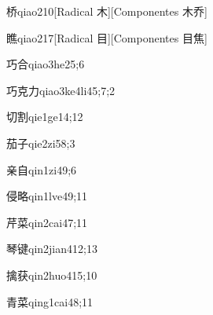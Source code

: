 \begin{verbete}{桥}{qiao2}{10}[Radical 木][Componentes 木乔]
\end{verbete}

\begin{verbete}{瞧}{qiao2}{17}[Radical 目][Componentes 目焦]
\end{verbete}

\begin{verbete}{巧合}{qiao3he2}{5;6}
\end{verbete}

\begin{verbete}{巧克力}{qiao3ke4li4}{5;7;2}
\end{verbete}

\begin{verbete}{切割}{qie1ge1}{4;12}
\end{verbete}

\begin{verbete}{茄子}{qie2zi5}{8;3}
\end{verbete}

\begin{verbete}{亲自}{qin1zi4}{9;6}
\end{verbete}

\begin{verbete}{侵略}{qin1lve4}{9;11}
\end{verbete}

\begin{verbete}{芹菜}{qin2cai4}{7;11}
\end{verbete}

\begin{verbete}{琴键}{qin2jian4}{12;13}
\end{verbete}

\begin{verbete}{擒获}{qin2huo4}{15;10}
\end{verbete}

\begin{verbete}{青菜}{qing1cai4}{8;11}
\end{verbete}

